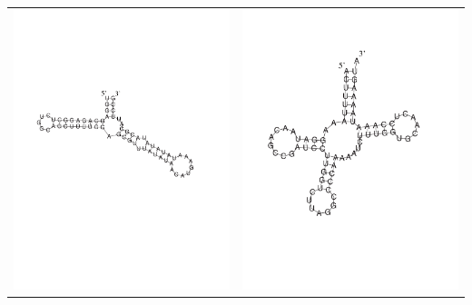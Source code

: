 \documentclass{article}
\begin{document}
  \centering
  \begin{tabular}{lr}
     \includegraphics [scale=0.4] {figs/nanos_ancestral_ss.pdf} \hspace{1in} &
     \includegraphics [scale=0.25] {figs/tRNA_ancestral_ss.pdf}
  \end{tabular}
\end{document}
